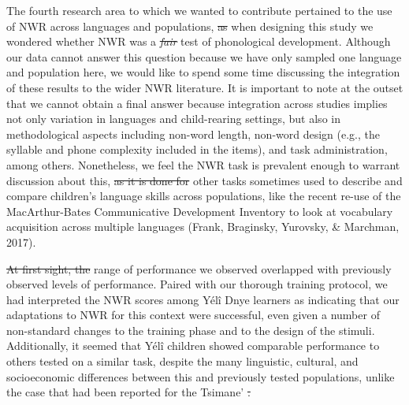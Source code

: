 \documentclass[ %
american, %
,man,floatsintext]{apa6} %
\providecommand{\DIFaddtex}[1]{{\protect\color{blue}\uwave{#1}}} %
\providecommand{\DIFdeltex}[1]{{\protect\color{red}\sout{#1}}}                      %
\providecommand{\DIFaddbegin}{} %
\providecommand{\DIFaddend}{} %
\providecommand{\DIFdelbegin}{} %
\providecommand{\DIFdelend}{} %
\providecommand{\DIFadd}[1]{\texorpdfstring{\DIFaddtex{#1}}{#1}} %
\providecommand{\DIFdel}[1]{\texorpdfstring{\DIFdeltex{#1}}{}} %
\newcommand{\DIFscaledelfig}{0.5}
\newlength{\DIFdelgraphicswidth} %
\newlength{\DIFdelgraphicsheight} %
\newcommand{\DIFaddincludegraphics}[2][]{{\color{blue}\fbox{\DIFOincludegraphics[#1]{#2}}}} %
\newcommand{\DIFdelincludegraphics}[2][]{%
	\sbox{\DIFdelgraphicsbox}{\DIFOincludegraphics[#1]{#2}}%
	\settoboxwidth{\DIFdelgraphicswidth}{\DIFdelgraphicsbox} %
	\settoboxtotalheight{\DIFdelgraphicsheight}{\DIFdelgraphicsbox} %
	\scalebox{\DIFscaledelfig}{%
		\parbox[b]{\DIFdelgraphicswidth}{\usebox{\DIFdelgraphicsbox}\\[-\baselineskip] \rule{\DIFdelgraphicswidth}{0em}}\llap{\resizebox{\DIFdelgraphicswidth}{\DIFdelgraphicsheight}{%
				\setlength{\unitlength}{\DIFdelgraphicswidth}%
				\begin{picture}(1,1)%
				\thicklines\linethickness{2pt} %
				{\color[rgb]{1,0,0}\put(0,0){\framebox(1,1){}}}%
				{\color[rgb]{1,0,0}\put(0,0){\line( 1,1){1}}}%
				{\color[rgb]{1,0,0}\put(0,1){\line(1,-1){1}}}%
				\end{picture}%
			}\hspace*{3pt}}} %
} %
\DeclareRobustCommand{\DIFaddbegin}{\DIFOaddbegin \let\includegraphics\DIFaddincludegraphics} %
\DeclareRobustCommand{\DIFaddend}{\DIFOaddend \let\includegraphics\DIFOincludegraphics} %
\DeclareRobustCommand{\DIFdelbegin}{\DIFOdelbegin \let\includegraphics\DIFdelincludegraphics} %
\DeclareRobustCommand{\DIFdelend}{\DIFOaddend \let\includegraphics\DIFOincludegraphics} %
\begin{document}
The fourth research area to which we wanted to contribute pertained to the use of NWR across languages and populations, \DIFdelbegin \DIFdel{as }\DIFdelend \DIFaddbegin \DIFadd{since }\DIFaddend when designing this study we wondered whether NWR was a \emph{\DIFdelbegin \DIFdel{fair}\DIFdelend \DIFaddbegin \DIFadd{culture-fair}\DIFaddend } test of phonological development. Although our data cannot answer this question because we have only sampled one language and population here, we would like to spend some time discussing the integration of these results to the wider NWR literature. It is important to note at the outset that we cannot obtain a final answer because integration across studies implies not only variation in languages and child-rearing settings, but also in methodological aspects including non-word length, non-word design (e.g., the syllable and phone complexity included in the items), and task administration, among others. Nonetheless, we feel the NWR task is prevalent enough to warrant discussion about this, \DIFdelbegin \DIFdel{as it is done for }\DIFdelend \DIFaddbegin \DIFadd{similarly to }\DIFaddend other tasks sometimes used to describe and compare children's language skills across populations, like the recent re-use of the MacArthur-Bates Communicative Development Inventory to look at vocabulary acquisition across multiple languages (Frank, Braginsky, Yurovsky, \& Marchman, 2017).

\DIFdelbegin \DIFdel{At first sight, the }\DIFdelend \DIFaddbegin \DIFadd{The }\DIFaddend range of performance we observed overlapped with previously observed levels of performance. Paired with our thorough training protocol, we had interpreted the NWR scores among Yélî Dnye learners as indicating that our adaptations to NWR for this context were successful, even given a number of non-standard changes to the training phase and to the design of the stimuli. Additionally, it seemed that Yélî children showed comparable performance to others tested on a similar task, despite the many linguistic, cultural, and socioeconomic differences between this and previously tested populations, unlike the case that had been reported for the Tsimane' \DIFdelbegin \DIFdel{.
}%
\end{document}
